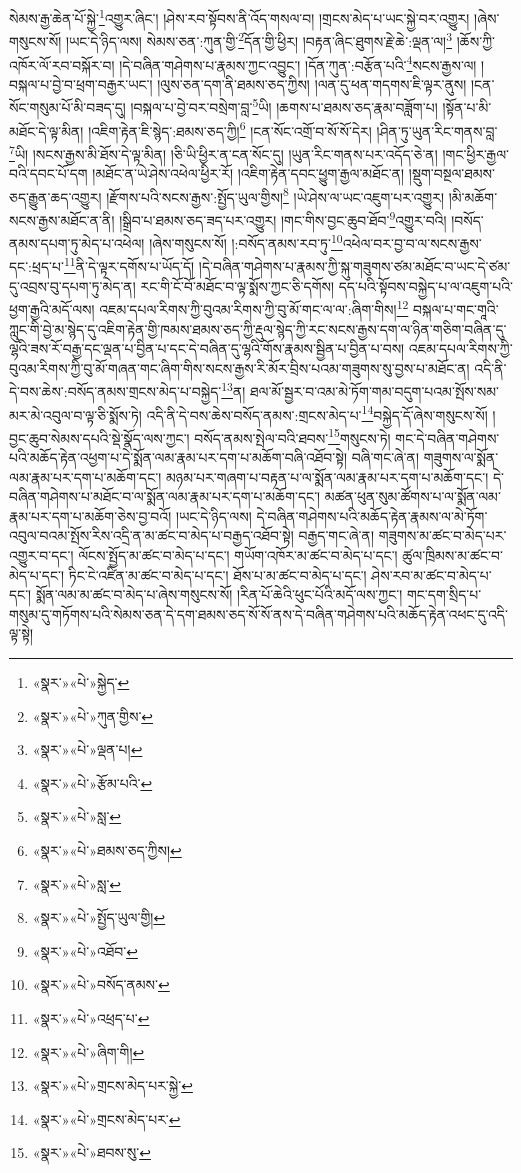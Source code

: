 སེམས་རྒྱ་ཆེན་པོ་སྐྱེ་\footnote{«སྣར་»«པེ་»སྐྱེད་}འགྱུར་ཞིང་། །ཤེས་རབ་སྟོབས་ནི་འོད་གསལ་བ། །གྲངས་མེད་པ་ཡང་སྐྱེ་བར་འགྱུར། །ཞེས་གསུངས་སོ། །ཡང་དེ་ཉིད་ལས། སེམས་ཅན་:ཀུན་གྱི་\footnote{«སྣར་»«པེ་»ཀུན་གྱིས་}དོན་གྱི་ཕྱིར། །བརྟན་ཞིང་ཐུགས་རྗེ་ཆེ་:ལྡན་ལ།\footnote{«སྣར་»«པེ་»ལྡན་པ།} །ཆོས་ཀྱི་འཁོར་ལོ་རབ་བསྐོར་བ། །དེ་བཞིན་གཤེགས་པ་རྣམས་ཀྱང་འབྱུང་། །དོན་ཀུན་:བརྩོན་པའི་\footnote{«སྣར་»«པེ་»རྩོམ་པའི་}སངས་རྒྱས་ལ། །བསྐལ་པ་བྱེ་བ་ཕྲག་བརྒྱར་ཡང་། །ལུས་ཅན་དག་ནི་ཐམས་ཅད་ཀྱིས། །ལན་དུ་ཕན་གདགས་ཇི་ལྟར་ནུས། །ངན་སོང་གསུམ་པོ་མི་བཟད་དུ། །བསྐལ་པ་བྱེ་བར་བསྲེག་བླ་\footnote{«སྣར་»«པེ་»སླ་}ཡི། །ཆགས་པ་ཐམས་ཅད་རྣམ་བཟློག་པ། །སྟོན་པ་མི་མཐོང་དེ་ལྟ་མིན། །འཇིག་རྟེན་ཇི་སྙེད་:ཐམས་ཅད་ཀྱི།\footnote{«སྣར་»«པེ་»ཐམས་ཅད་ཀྱིས།} །ངན་སོང་འགྲོ་བ་སོ་སོ་དེར། །ཤིན་ཏུ་ཡུན་རིང་གནས་བླ་\footnote{«སྣར་»«པེ་»སླ་}ཡི། །སངས་རྒྱས་མི་ཐོས་དེ་ལྟ་མིན། །ཅི་ཡི་ཕྱིར་ན་ངན་སོང་དུ། །ཡུན་རིང་གནས་པར་འདོད་ཅེ་ན། །གང་ཕྱིར་རྒྱལ་བའི་དབང་པོ་དག །མཐོང་ན་ཡེ་ཤེས་འཕེལ་ཕྱིར་རོ། །འཇིག་རྟེན་དབང་ཕྱུག་རྒྱལ་མཐོང་ན། །སྡུག་བསྔལ་ཐམས་ཅད་རྒྱུན་ཆད་འགྱུར། །རྫོགས་པའི་སངས་རྒྱས་:སྤྱོད་ཡུལ་གྱིས།\footnote{«སྣར་»«པེ་»སྤྱོད་ཡུལ་གྱི།} །ཡེ་ཤེས་ལ་ཡང་འཇུག་པར་འགྱུར། །མི་མཆོག་སངས་རྒྱས་མཐོང་ན་ནི། །སྒྲིབ་པ་ཐམས་ཅད་ཟད་པར་འགྱུར། །གང་གིས་བྱང་ཆུབ་ཐོབ་\footnote{«སྣར་»«པེ་»འཐོབ་}འགྱུར་བའི། །བསོད་ནམས་དཔག་ཏུ་མེད་པ་འཕེལ། །ཞེས་གསུངས་སོ། །:བསོད་ནམས་རབ་ཏུ་\footnote{«སྣར་»«པེ་»བསོད་ནམས་}འཕེལ་བར་བྱ་བ་ལ་སངས་རྒྱས་དང་:ཕྲད་པ་\footnote{«སྣར་»«པེ་»འཕྲད་པ་}ནི་དེ་ལྟར་དགོས་པ་ཡོད་དོ། །དེ་བཞིན་གཤེགས་པ་རྣམས་ཀྱི་སྐུ་གཟུགས་ཙམ་མཐོང་བ་ཡང་དེ་ཙམ་དུ་འབྲས་བུ་དཔག་ཏུ་མེད་ན། རང་གི་ངོ་བོ་མཐོང་བ་ལྟ་སྨོས་ཀྱང་ཅི་དགོས། དད་པའི་སྟོབས་བསྐྱེད་པ་ལ་འཇུག་པའི་ཕྱག་རྒྱའི་མདོ་ལས། འཇམ་དཔལ་རིགས་ཀྱི་བུའམ་རིགས་ཀྱི་བུ་མོ་གང་ལ་ལ་:ཞིག་གིས།\footnote{«སྣར་»«པེ་»ཞིག་གི།} བསྐལ་པ་གང་གཱའི་ཀླུང་གི་བྱེ་མ་སྙེད་དུ་འཇིག་རྟེན་གྱི་ཁམས་ཐམས་ཅད་ཀྱི་རྡུལ་སྙེད་ཀྱི་རང་སངས་རྒྱས་དག་ལ་ཉིན་གཅིག་བཞིན་དུ་ལྷའི་ཟས་རོ་བརྒྱ་དང་ལྡན་པ་བྱིན་པ་དང་དེ་བཞིན་དུ་ལྷའི་གོས་རྣམས་སྦྱིན་པ་བྱིན་པ་བས། འཇམ་དཔལ་རིགས་ཀྱི་བུའམ་རིགས་ཀྱི་བུ་མོ་གཞན་གང་ཞིག་གིས་སངས་རྒྱས་རི་མོར་བྲིས་པའམ་གཟུགས་སུ་བྱས་པ་མཐོང་ན། འདི་ནི་དེ་བས་ཆེས་:བསོད་ནམས་གྲངས་མེད་པ་བསྐྱེད་\footnote{«སྣར་»«པེ་»གྲངས་མེད་པར་སྐྱེ་}ན། ཐལ་མོ་སྦྱར་བ་འམ་མེ་ཏོག་གམ་བདུག་པའམ་སྤོས་སམ་མར་མེ་འབུལ་བ་ལྟ་ཅི་སྨོས་ཏེ། འདི་ནི་དེ་བས་ཆེས་བསོད་ནམས་:གྲངས་མེད་པ་\footnote{«སྣར་»«པེ་»གྲངས་མེད་པར་}བསྐྱེད་དོ་ཞེས་གསུངས་སོ། །བྱང་ཆུབ་སེམས་དཔའི་སྡེ་སྣོད་ལས་ཀྱང་། བསོད་ནམས་སྤེལ་བའི་ཐབས་\footnote{«སྣར་»«པེ་»ཐབས་སུ་}གསུངས་ཏེ། གང་དེ་བཞིན་གཤེགས་པའི་མཆོད་རྟེན་འཕྱག་པ་དེ་སྨོན་ལམ་རྣམ་པར་དག་པ་མཆོག་བཞི་འཐོབ་སྟེ། བཞི་གང་ཞེ་ན། གཟུགས་ལ་སྨོན་ལམ་རྣམ་པར་དག་པ་མཆོག་དང་། མཉམ་པར་གཞག་པ་བརྟན་པ་ལ་སྨོན་ལམ་རྣམ་པར་དག་པ་མཆོག་དང་། དེ་བཞིན་གཤེགས་པ་མཐོང་བ་ལ་སྨོན་ལམ་རྣམ་པར་དག་པ་མཆོག་དང་། མཚན་ཕུན་སུམ་ཚོགས་པ་ལ་སྨོན་ལམ་རྣམ་པར་དག་པ་མཆོག་ཅེས་བྱ་བའོ། །ཡང་དེ་ཉིད་ལས། དེ་བཞིན་གཤེགས་པའི་མཆོད་རྟེན་རྣམས་ལ་མེ་ཏོག་འབུལ་བའམ་སྤོས་རིས་འདྲི་ན་མ་ཚང་བ་མེད་པ་བརྒྱད་འཐོབ་སྟེ། བརྒྱད་གང་ཞེ་ན། གཟུགས་མ་ཚང་བ་མེད་པར་འགྱུར་བ་དང་། ལོངས་སྤྱོད་མ་ཚང་བ་མེད་པ་དང་། གཡོག་འཁོར་མ་ཚང་བ་མེད་པ་དང་། ཚུལ་ཁྲིམས་མ་ཚང་བ་མེད་པ་དང་། ཏིང་ངེ་འཛིན་མ་ཚང་བ་མེད་པ་དང་། ཐོས་པ་མ་ཚང་བ་མེད་པ་དང་། ཤེས་རབ་མ་ཚང་བ་མེད་པ་དང་། སྨོན་ལམ་མ་ཚང་བ་མེད་པ་ཞེས་གསུངས་སོ། །རིན་པོ་ཆེའི་ཕུང་པོའི་མདོ་ལས་ཀྱང་། གང་དག་སྲིད་པ་གསུམ་དུ་གཏོགས་པའི་སེམས་ཅན་དེ་དག་ཐམས་ཅད་སོ་སོ་ནས་དེ་བཞིན་གཤེགས་པའི་མཆོད་རྟེན་འཕང་དུ་འདི་ལྟ་སྟེ། 